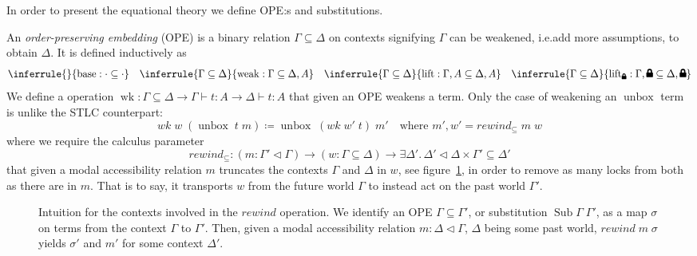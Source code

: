 \documentclass[12pt,twoside,openright]{report}
\numberwithin{equation}{chapter}
\numberwithin{figure}{chapter}
\numberwithin{table}{chapter}
\theoremstyle{definition}\newtheorem{definition}{Definition}
\newcommand{\lock}{\text{\tikz[baseline]{
      \fill[rounded corners=.1ex] (-.75ex,0) rectangle (.75ex,1ex);
      \draw[line width=.3ex] (-.4ex,.5ex) -- ++(0,.75ex) arc (180:0:.4ex) -- ++(0,-.75ex);
}}}
\begin{document}
In order to present the equational theory
we define OPE:s and substitutions.

An \emph{order-preserving embedding} (OPE) is a binary relation $\Gamma \subseteq \Delta$ on contexts
signifying $\Gamma$ can be weakened, i.e.\@ add more assumptions,
to obtain $\Delta$.
It is defined inductively as
\begin{equation*}
  \inferrule{ }{\operatorname{base} : \cdot \subseteq \cdot} \quad
  \inferrule{\Gamma \subseteq \Delta}{\operatorname{weak} : \Gamma \subseteq \Delta, A} \quad
  \inferrule{\Gamma \subseteq \Delta}{\operatorname{lift} : \Gamma, A \subseteq \Delta, A} \quad
  \inferrule{\Gamma \subseteq \Delta}{\operatorname{lift}_\lock : \Gamma, \lock \subseteq \Delta, \lock}
\end{equation*}
We define a operation
$\operatorname{wk} : \Gamma\subseteq\Delta \to \Gamma \vdash t : A \to \Delta \vdash t : A$
that given an OPE weakens a term.
Only the case of weakening an $\operatorname{unbox}$ term is unlike the STLC counterpart:
$$ \textit{wk} \; w \; (\operatorname{unbox} \; t \; m) \coloneqq \operatorname{unbox} \; (\textit{wk} \; w' \; t) \; m' \quad \text{where } m' , w' = \textit{rewind}_\subseteq \; m \; w $$
where we require the calculus parameter
$$ \textit{rewind}_\subseteq : (m : \Gamma'\lhd\Gamma) \to (w : \Gamma\subseteq\Delta) \to \exists \Delta'. \, \Delta'\lhd\Delta \times \Gamma'\subseteq\Delta' $$
that given a modal accessibility relation $m$
truncates the contexts $\Gamma$ and $\Delta$ in $w$,
see figure~\ref{fig:rewind},
in order to remove as many locks from both as there are in $m$.
That is to say, it transports $w$ from the future world $\Gamma$ to instead act on the past world $\Gamma'$.

\begin{figure}
  \centering
  \caption{Intuition for the contexts involved in the $\textit{rewind}$ operation.
    We identify an OPE $\Gamma \subseteq \Gamma'$,
    or substitution $\operatorname{Sub} \Gamma \; \Gamma'$,
    as a map $\sigma$ on terms from the context $\Gamma$ to $\Gamma'$.
    Then, given a modal accessibility relation $m : \Delta \lhd \Gamma$,
    $\Delta$ being some past world,
    $\textit{rewind} \; m \; \sigma$ yields $\sigma'$ and $m'$
    for some context $\Delta'$.
    \label{fig:rewind}}
\end{figure}
\end{document}
